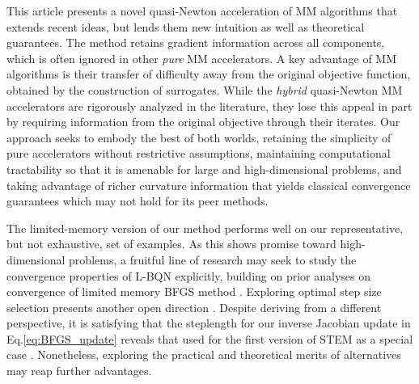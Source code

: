 \documentclass{statsoc}
\begin{document}
This article presents a novel quasi-Newton acceleration of MM algorithms that extends recent ideas, but lends them new intuition as well as theoretical guarantees. %
The method  retains gradient information across all components, which is often ignored in other \textit{pure} MM accelerators. %
A key advantage of MM algorithms is their transfer of difficulty away from the original objective function, obtained by the construction of surrogates. While the \textit{hybrid} quasi-Newton MM accelerators \citep{lange1995quasi, heiser1995convergent, lange2000optimization} are rigorously analyzed in the literature, they lose this appeal in part by requiring information from the original objective through their iterates. Our approach seeks to embody the best of both worlds,  retaining the simplicity of pure accelerators without restrictive assumptions, maintaining computational tractability so that it is amenable for large and high-dimensional problems, and taking advantage of richer curvature information that yields classical convergence guarantees which may not hold for its peer methods.

The limited-memory version of our method performs well on our representative, but not exhaustive, set of examples. As this  shows promise toward high-dimensional problems, a fruitful line of research may seek to study the convergence properties of L-BQN explicitly, building on prior analyses on  convergence of limited memory BFGS method \citep{liu1989limited}. Exploring optimal step size selection presents another open direction \citep{nocedal2006numerical}. Despite deriving from a different perspective, it is satisfying that the steplength for our inverse Jacobian update in Eq.\eqref{eq:BFGS_update} reveals that used for the first version of STEM as a special case \cite{varadhan2008simple}. Nonetheless, exploring the practical and theoretical merits of alternatives may reap further advantages. %

\end{document}
